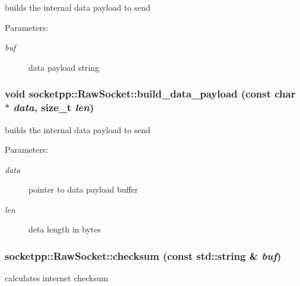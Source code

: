 builds the internal data payload to send 

\begin{Desc}
\item[Parameters:]
\begin{description}
\item[{\em buf}]data payload string \end{description}
\end{Desc}
\hypertarget{classsocketpp_1_1RawSocket_99ea2415525269d24ba088a58d62abdd}{
\subsubsection[{build\_\-data\_\-payload}]{\setlength{\rightskip}{0pt plus 5cm}void socketpp::RawSocket::build\_\-data\_\-payload (const char $\ast$ {\em data}, \/  size\_\-t {\em len})}}
\label{classsocketpp_1_1RawSocket_99ea2415525269d24ba088a58d62abdd}


builds the internal data payload to send 

\begin{Desc}
\item[Parameters:]
\begin{description}
\item[{\em data}]pointer to data payload buffer \item[{\em len}]deta length in bytes \end{description}
\end{Desc}
\hypertarget{classsocketpp_1_1RawSocket_67af2c9f3bc37146b54fc9fb69c0dd8d}{
\subsubsection[{checksum}]{ socketpp::RawSocket::checksum (const std::string \& {\em buf})}}
\label{classsocketpp_1_1RawSocket_67af2c9f3bc37146b54fc9fb69c0dd8d}


calculates internet checksum 

